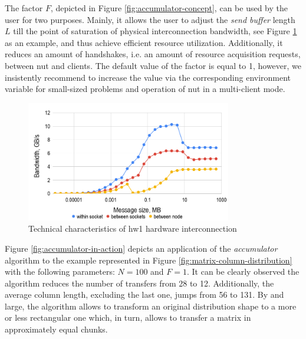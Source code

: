 The factor $F$, depicted in Figure \ref{fig:accumulator-concept}, can be used by the user for two purposes. Mainly, it allows the user to adjust the \textit{send buffer} length $L$ till the point of saturation of physical interconnection bandwidth, see Figure \ref{fig:hw1-bandwidth} as an example, and thus achieve efficient resource utilization. Additionally, it reduces an amount of handshakes, i.e. an amount of resource acquisition requests, between \acrshort{nut} and clients. The default value of the factor is equal to 1, however, we insistently recommend to increase the value via the corresponding environment variable for small-sized problems and operation of \acrshort{nut} in a multi-client mode.\\


\begin{figure}[htpb]
  \centering
  \includegraphics[width=0.8\textwidth]{figures/chapter-3/hw1-bandwidth.png}
  \caption{Technical characteristics of  \gls{hw1} hardware interconnection} \label{fig:hw1-bandwidth}
\end{figure}



Figure \ref{fig:accumulator-in-action} depicts an application of the \textit{accumulator} algorithm to the example represented in Figure \ref{fig:matrix-column-distribution} with the following parameters: $N = 100$ and $F = 1$. It can be clearly observed the algorithm reduces the number of transfers from 28 to 12. Additionally, the average column length, excluding the last one, jumps from 56 to 131. By and large, the algorithm allows to transform an original distribution shape to a more or less rectangular one which, in turn, allows to transfer a matrix in approximately equal chunks.\\



